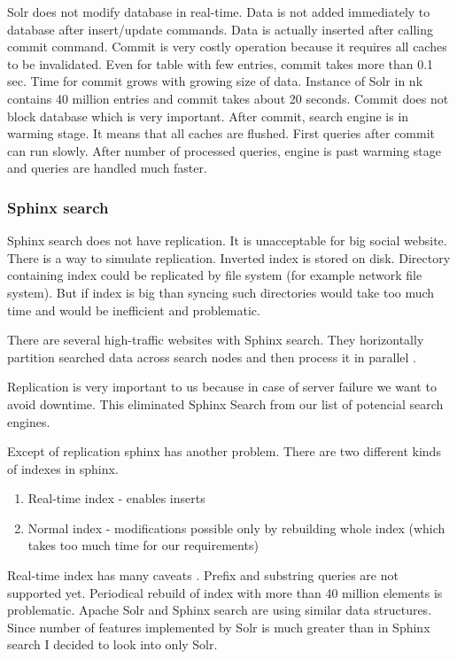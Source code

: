 \documentclass[10pt,a4paper]{article}
\begin{document}
Solr does not modify database in real-time. Data is not added immediately to database after insert/update commands. Data is actually inserted after calling commit command. Commit is very costly operation because it requires all caches to be invalidated. Even for table with few entries, commit takes more than 0.1 sec. Time for commit grows with growing size of data. Instance of Solr in nk contains 40 million entries and commit takes about 20 seconds. Commit does not block database which is very important. After commit, search engine is in warming stage. It means that all caches are flushed. First queries after commit can run slowly. After number of processed queries, engine is past warming stage and queries are handled much faster.

\subsubsection{Sphinx search}

Sphinx search does not have replication. It is unacceptable for big social website. There is a way to simulate replication. Inverted index is stored on disk. Directory containing index could be replicated by file system (for example network file system). But if index is big than syncing such directories would take too much time and would be inefficient and problematic.

There are several high-traffic websites with Sphinx search. They horizontally partition searched data across search nodes and then process it in parallel \cite{SPHINXPARAL}.

Replication is very important to us because in case of server failure we want to avoid downtime. This eliminated Sphinx Search from our list of potencial search engines. 

Except of replication sphinx has another problem. There are two different kinds of indexes in sphinx.
\begin{enumerate}
\item Real-time index - enables inserts
\item Normal index - modifications possible only by rebuilding whole index (which takes too much time for our requirements)
\end{enumerate}

Real-time index has many caveats \cite{SPHINXCAV}. Prefix and substring queries are not supported yet. Periodical rebuild of index with more than 40 million elements is problematic. Apache Solr and Sphinx search are using similar data structures. Since number of features implemented by Solr is much greater than in Sphinx search I decided to look into only Solr. 
\end{document}
